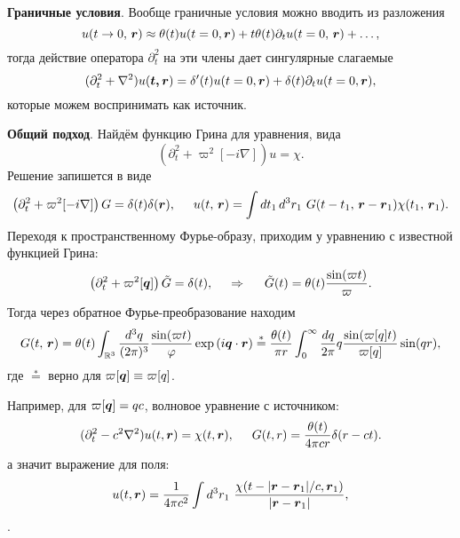 
\textbf{Граничные условия}. 
Вообще граничные условия можно вводить из разложения
\begin{equation*}
    u(t\to 0,\, \mbox{\boldmath $r$}) \approx \theta(t) u(t=0, \mbox{\boldmath $r$}) + t \theta(t) \partial_t u(t=0,\, \mbox{\boldmath $r$}) + \ldots,
\end{equation*}
тогда действие оператора $\partial_t^2$ на эти члены дает сингулярные слагаемые
\begin{equation*}
    (\partial_t^2 + \nabla^2)u(\mbox{\boldmath $t,r$}) = \delta'(t) u(t=0, \mbox{\boldmath $r$}) + \delta(t) \partial_t u(t=0, \mbox{\boldmath $r$}),
\end{equation*}
которые можем воспринимать как источник.




\textbf{Общий подход}. Найдём функцию Грина для уравнения, вида
\begin{equation*}
    \left(\partial_t^2 + \varpi^2[-i \nabla]\right) u = \chi.
\end{equation*}
Решение запишется в виде
\begin{equation*}
    \left(
        \partial_t^2 + \varpi^2[-i \nabla]
    \right) G = \delta(t) \delta(\vc{r}),
    \hspace{5 mm} 
    u(t,\, \vc{r}) = \int dt_1\, d^3 r_1\ 
    G(t-t_1,\, \vc{r}- \vc{r}_1) \chi(t_1,\, \vc{r}_1).
\end{equation*}
Переходя к пространственному Фурье-образу, приходим у уравнению с известной функцией Грина:
\begin{equation*}
    \left(\partial_t^2 + \varpi^2[\mbox{\boldmath $q$}]\right) \tilde{G} = \delta(t),
    \hspace{0.5cm} \Rightarrow \hspace{0.5cm}   
    \tilde{G}(t) = \theta(t) \frac{\sin(\varpi t)}{\varpi}.
\end{equation*}
Тогда через обратное Фурье-преобразование находим
\begin{equation*}
    G(t,\, \mbox{\boldmath $r$}) = \theta(t) \int_{\mathbb{R}^3} \frac{d^3 q}{(2\pi)^3} \frac{\sin(\varpi t)}{\varphi} \exp\left(i \mbox{\boldmath $q$} \cdot \mbox{\boldmath $r$}\right) \overset{*}{=} 
    \frac{\theta(t)}{\pi r} \int_{0}^{\infty}  \frac{dq}{2\pi} q \frac{\sin(\varpi[q] t)}{\varpi[q]} \sin(qr)
    ,
\end{equation*}
где $\overset{*}{=}$ верно для $\varpi[\mbox{\boldmath $q$}] \equiv \varpi[q]$. 



Например, для $\varpi[\mbox{\boldmath $q$}] = qc$, волновое уравнение с источником:
\begin{equation}
    (\partial_t^2 - c^2 \nabla^2) u(t, \mbox{\boldmath $r$}) = \chi(t, \mbox{\boldmath $r$}),
    \hspace{5 mm} 
    G(t, r) = \frac{\theta(t)}{4 \pi c r} \delta(r - ct).
\end{equation}
а значит выражение для поля:
\begin{equation}
    u(t, \mbox{\boldmath $r$}) = \frac{1}{4 \pi c^2} \int d^3 r_1 \ \frac{\chi(t-|\mbox{\boldmath $r$} - \mbox{\boldmath $r$}_1|/c, \mbox{\boldmath $r$}_1)}{|\mbox{\boldmath $r$} - \mbox{\boldmath $r$}_1|},
\end{equation}
.


